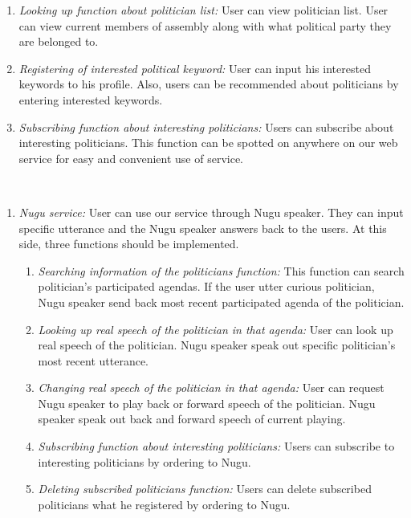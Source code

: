 \documentclass[conference]{IEEEtran}
\begin{document}
\begin{enumerate}
\begin{enumerate}
        \item \textit {Looking up function about politician list:} User can view politician list. User can view current members of assembly along with what political party they are belonged to.\\
        
        \item \textit {Registering of interested political keyword:} User can input his interested keywords to his profile. Also, users can be recommended about politicians by entering interested keywords. \\
        
        \item \textit {Subscribing function about interesting politicians:} Users can subscribe about interesting politicians. This function can be spotted on anywhere on our web service for easy and convenient use of service.\\
        \end{enumerate}
    \end{enumerate}
    \\
    \begin{enumerate}
        \item \textit{Nugu service:} User can use our service through Nugu speaker. They can input specific utterance and the Nugu speaker answers back to the users. At this side, three functions should be implemented.\\
        
        \begin{enumerate}
        \item \textit{Searching information of the politicians function:} This function can search politician’s participated agendas. If the user utter curious politician, Nugu speaker send back most recent participated agenda of the politician.\\
        
 
        \item \textit{Looking up real speech of the politician in that agenda:} User can look up real speech of the politician. Nugu speaker speak out specific politician’s most recent utterance.\\
        
        \item \textit{Changing real speech of the politician in that agenda:} User can request Nugu speaker to play back or forward speech of the politician. Nugu speaker speak out back and forward speech of current playing.\\
        
        \item \textit {Subscribing function about interesting politicians:} Users can subscribe to interesting politicians by ordering to Nugu.\\
        
        \item \textit {Deleting subscribed politicians function:} Users can delete subscribed politicians what he registered by ordering to Nugu. \\
           \end{enumerate}
    \end{enumerate}
\end{document}

